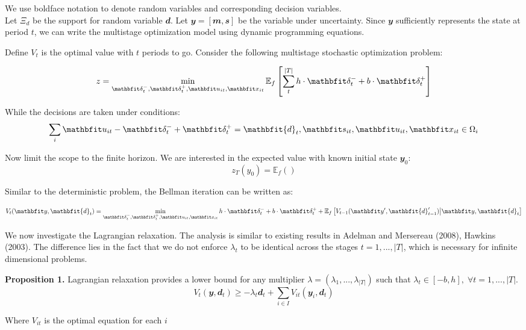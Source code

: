\documentclass[
  a4paper,
,tablecaptionabove
]{scrartcl}
\numberwithin{equation}{section}
\begin{document}
We use boldface notation to denote random variables and corresponding
decision variables.\\
Let \(\Xi_d\) be the support for random variable \(\mathbfit{d}\). Let
\(\mathbfit y = \left[\mathbfit m,\mathbfit s \right]\) be the
variable under uncertainty. Since \(\mathbfit y\) sufficiently
represents the state at period \(t\), we can write the multistage
optimization model using dynamic programming equations.

Define \(V_{t}\) is the optimal value with \(t\) periods to go. Consider
the following multistage stochastic optimization problem:

\[z = \min_{\small{\mathbfit\delta^-_t, \mathbfit\delta^+_t, \mathbfit u_{it}, \mathbfit x_{it}}}
  \mathbb{E}_f \left[ \sum_t^{|T|}h \cdot \mathbfit \delta^-_t + b \cdot \mathbfit \delta^+_t \right ]\]

While the decisions are taken under conditions:
\[\sum_i \mathbfit u_{it} - \mathbfit\delta^-_t + \mathbfit\delta^+_t = \mathbfit{d}_t, \quad \\
  \mathbfit s_{it}, \mathbfit u_{it}, \mathbfit x_{it}\in \Omega_i\]

Now limit the scope to the finite horizon. We are interested in the
expected value with known initial state \(\mathbfit y_0\): \[
  z_T(y_0) = \mathbb{E}_f ()
\]

Similar to the deterministic problem, the Bellman iteration can be
written as:

\[V_{t}(\mathbfit y, \mathbfit{d}_t) =
  \min_{\small{\mathbfit\delta^-_t, \mathbfit\delta^+_t, \mathbfit u_{it}, \mathbfit x_{it}}}
  h \cdot \mathbfit \delta^-_t + b \cdot \mathbfit \delta^+_t + \mathbb E_{f} \left [ V_{t-1}(\mathbfit y', \mathbfit{d}'_{t-1}) \big | \mathbfit y, \mathbfit{d}_t\right]\]

We now investigate the Lagrangian relaxation. The analysis is similar to
existing results in Adelman and Mersereau (2008), Hawkins (2003). The
difference lies in the fact that we do not enforce \(\lambda_t\) to be
identical across the stages \(t = 1, ..., |T|\), which is necessary for
infinite dimensional problems.

\textbf{Proposition 1.} Lagrangian relaxation provides a lower bound for
any multiplier \(\lambda = (\lambda_1, ..., \lambda_{|T|})\) such that
\(\lambda_t \in [-b, h],\; \forall t=1,..., |T|\).
\[V_{t}(\mathbfit y, \mathbfit d_t) \ge -\lambda_t \mathbfit d_t + \sum_{i\in I} V_{it}(\mathbfit y_i, \mathbfit d_t)\]

Where \(V_{it}\) is the optimal equation for each \(i\)
\end{document}
